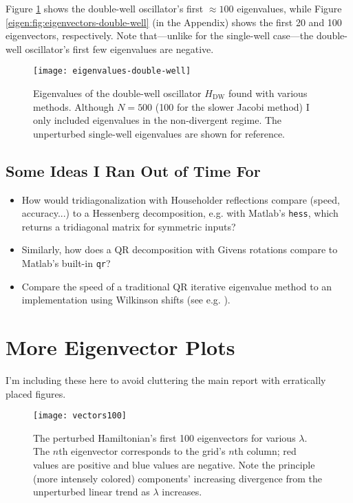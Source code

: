 \documentclass[11pt, a4paper]{article}
\begin{document}
Figure \ref{eigen:fig:eigenvalues-double-well} shows the double-well oscillator's first $ \approx 100 $ eigenvalues, while Figure \ref{eigen:fig:eigenvectors-double-well} (in the Appendix) shows the first 20 and 100 eigenvectors, respectively. Note that---unlike for the single-well case---the double-well oscillator's first few eigenvalues are negative.


\begin{figure}[hbt!]
	\centering
	\texttt{[image: eigenvalues-double-well]}
	\caption{Eigenvalues of the double-well oscillator $ H_{\text{DW}} $ found with various methods. Although $ N = 500 $ (100 for the slower Jacobi method) I only included eigenvalues in the non-divergent regime. The unperturbed single-well eigenvalues are shown for reference.}
	\label{eigen:fig:eigenvalues-double-well}
\end{figure}



\subsection{Some Ideas I Ran Out of Time For}
\begin{itemize}
	\item How would tridiagonalization with Householder reflections compare (speed, accuracy...) to a Hessenberg decomposition, e.g. with Matlab's \texttt{hess}, which returns a tridiagonal matrix for symmetric inputs?
	
	\item Similarly, how does a QR decomposition with Givens rotations compare to Matlab's  built-in \texttt{qr}?
	
	\item Compare the speed of a traditional QR iterative eigenvalue method to an implementation using Wilkinson shifts (see e.g. \cite{qr}).
	
\end{itemize}







\appendix

\section{More Eigenvector Plots} \label{eigen:s:more-graphs-A}
I'm including these here to avoid cluttering the main report with erratically placed figures.


\begin{figure}[htb!]
	\centering
	\texttt{[image: vectors100]}
	\caption{The perturbed Hamiltonian's first 100 eigenvectors for various $ \lambda $. The $ n $th eigenvector corresponds to the grid's $ n $th column; red values are positive and blue values are negative. Note the principle (more intensely colored) components' increasing divergence from the unperturbed linear trend as $ \lambda $ increases.}
	\label{eigen:fig:eigenvectors-100}
\end{figure}
\end{document}
